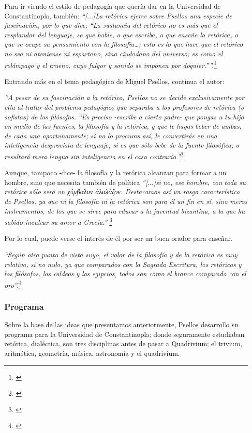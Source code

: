Para ir viendo el estilo de pedagogía que quería dar en la 
Universidad de Constantinopla, también: \textit{“[...]La retórica ejerce 
sobre Psellos una especie de fascinación, por lo que dice: 
“La sustancia del retórico no es más que el resplandor del lenguaje, 
se que hable, o que escriba, o que enseñe la retórica, 
o que se ocupe su pensamiento con la filosofía…; esto es lo que 
hace que el retórico no sea ni ateniense ni espartano, sino ciudadano 
del universo; es como el relámpago y el trueno, cuyo fulgor y sonido 
se imponen por doquier.””.}\footnote{\cite[p.~161]{filosofia}}

Entrando más en el tema pedagógico de Miguel Psellos, continua el autor:

\textit{“A pesar de su fascinación a la retórico, Psellos no se decide 
exclusivamente por ella al tratar del problema pedagógico que separaba 
a los profesores de retórica (o sofistas) de los filósofos. 
“Es preciso -escribe a cierto padre- que pongas a tu hijo en medio de 
las fuentes, la filosofía y la retórica, y que le hagas beber de ambas, 
de cada una oportunamente; si no lo procuras así, le convertirás en 
una inteligencia desprovista de lenguaje, si es que sólo bebe de la 
fuente filosófica; o resultará mera lengua sin inteligencia en el 
caso contrario.”}\footnote{\cite[p.~161]{filosofia}}

Aunque, tampoco -dice- la filosofía y la retórica alcanzan para formar a un hombre,
sino que necesita también de política
\textit{“[...]si no, ese hombre, con toda su 
retórica sólo será un 
	χύμβαλον άλαλάζον.
 Destacamos así un rasgo característico de Psellos, ya que ni la 
 filosofía ni la retórica son para él un fin en sí, sino meros 
 instrumentos, de los que se sirve para educar a la juventud bizantina, 
 a la que ha sabido inculcar su amor a Grecia.”} \footnote{\cite[p.~161]{filosofia}}

Por lo cual, puede verse el interés de él por ser un buen 
orador para enseñar.

\textit{“Según otro punto de vista suyo, el valor de la filosofía y de la 
retórica es muy relativo, si no nulo, ya que comparados con la 
Sagrada Escritura, los retóricos y los filósofos, 
los caldeos y los egipcios, todos son como el 
bronce comparado con el oro”.}\footnote{\cite[p.~161]{filosofia}}

\subsubsection{Programa}
Sobre la base de las ideas que presentamos anteriormente,
Psellos desarrollo su 
programa para la Universidad de Constantinopla; donde seguramente
estudiaban retórica, dialéctica, son tres disciplinas antes
de pasar a Quadrivium;
el trivium, aritmética, geometría, 
música, astronomía y el quadrivium.

